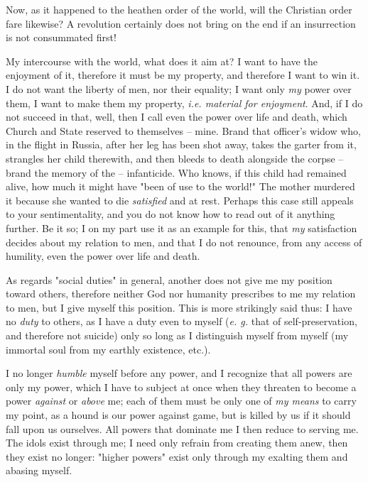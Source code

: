 \documentclass[a4paper]{book}
\begin{document}
Now, as it happened to the heathen order of the world, will the Christian 
order fare likewise? A revolution certainly does not bring on the end if an 
insurrection is not consummated first!

My intercourse with the world, what does it aim at? I want to have the 
enjoyment of it, therefore it must be my property, and therefore I want to win 
it. I do not want the liberty of men, nor their equality; I want only 
\textit{my} power over them, I want to make them my property, \textit{i.e. 
material for enjoyment}. And, if I do not succeed in that, well, then I call 
even the power over life and death, which Church and State reserved to 
themselves -- mine. Brand that officer's widow who, in the flight in Russia, 
after her leg has been shot away, takes the garter from it, strangles her 
child therewith, and then bleeds to death alongside the corpse -- brand the 
memory of the -- infanticide. Who knows, if this child had remained alive, how 
much it might have "{}been of use to the world!"{} The mother murdered it 
because she wanted to die \textit{satisfied} and at rest. Perhaps this case 
still appeals to your sentimentality, and you do not know how to read out of 
it anything further. Be it so; I on my part use it as an example for this, 
that \textit{my} satisfaction decides about my relation to men, and that I do 
not renounce, from any access of humility, even the power over life and death.

As regards "{}social duties"{} in general, another does not give me my 
position toward others, therefore neither God nor humanity prescribes to me my 
relation to men, but I give myself this position. This is more strikingly said 
thus: I have no \textit{duty} to others, as I have a duty even to myself 
(\textit{e. g.} that of self-preservation, and therefore not suicide) only so 
long as I distinguish myself from myself (my immortal soul from my earthly 
existence, etc.).

I no longer \textit{humble} myself before any power, and I recognize that all 
powers are only my power, which I have to subject at once when they threaten 
to become a power \textit{against} or \textit{above} me; each of them must be 
only one of \textit{my means} to carry my point, as a hound is our power 
against game, but is killed by us if it should fall upon us ourselves. All 
powers that dominate me I then reduce to serving me. The idols exist through 
me; I need only refrain from creating them anew, then they exist no longer: 
"{}higher powers"{} exist only through my exalting them and abasing myself.
\end{document}
